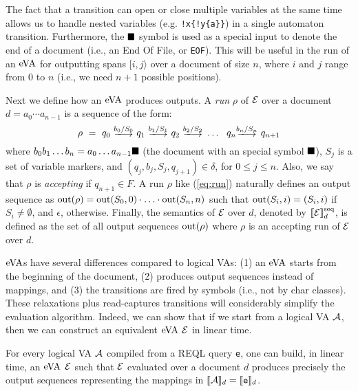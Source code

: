 The fact that a transition can open or close multiple variables at the same time
	allows us to handle nested variables (e.g. \texttt{!x\{!y\{a\}\}}) in a
	single automaton transition. Furthermore, the $\blacksquare$ symbol is used as a
	special input to denote the end of a document (i.e., an End Of File, or
	\texttt{EOF}). This will be useful in the run of an $\mathrm{eVA}$ for outputting
	spans $[i, j\rangle$ over a document of size $n$, where $i$ and $j$ range
	from $0$ to $n$ (i.e., we need $n+1$ possible positions).

Next we define how an $\mathrm{eVA}$ produces outputs. A \emph{run} $\rho$ of $\mathcal{E}$ over
a document $d = a_0 \cdots a_{n-1}$ is a sequence of the form:
\begin{equation}\label{eq:run}
	\rho \ = \ q_0 \ \longtrans{b_0 / S_0} \ q_1 \ \longtrans{b_1 / S_1} \ q_2 \ \longtrans{b_2 / S_2} \ \ldots \ \ q_{n} \longtrans{b_{n} / S_n} \ q_{n+1}
\end{equation}
where $b_0 b_1 \ldots b_n = a_0 \ldots a_{n-1} \blacksquare$ (the document with an
special symbol $\blacksquare$), $S_j$ is a set of variable markers, and
$(q_j,b_{j},S_{j}, q_{j+1}) \in \delta$, for $0\leq j\leq n$. Also, we say that
$\rho$ is \emph{accepting} if $q_{n+1} \in F$. A run $\rho$ like (\ref{eq:run})
naturally defines an output sequence as $\operatorname{out}(\rho) = \operatorname{out}(S_0, 0) \cdot
\ldots \cdot \operatorname{out}(S_n, n)$ such that $\operatorname{out}(S_i, i) = (S_i, i)$ if $S_i \neq
\emptyset$, and $\epsilon$, otherwise. Finally, the semantics of $\mathcal{E}$ over $d$,
denoted by $\llbracket\mathcal{E}\rrbracket^{\operatorname{seq}}_d$, is defined as the set of all output sequences
$\operatorname{out}(\rho)$ where $\rho$ is an accepting run of $\mathcal{E}$ over $d$.

$\mathrm{eVA}$s have several differences compared to logical VAs: (1) an $\mathrm{eVA}$ starts
from the beginning of the document, (2) produces output sequences instead of
mappings, and (3) the transitions are fired by symbols (i.e., not by char
classes). These relaxations plus read-captures transitions will considerably
simplify the evaluation algorithm.  Indeed, we can show that if we start from a
logical VA $\mathcal{A}$, then we can construct an equivalent $\mathrm{eVA}$ $\mathcal{E}$ in linear
time. %
\begin{proposition}\label{prop:eVAconstruction}
	For every logical VA $\mathcal{A}$ compiled from a REQL query \texttt{e}, one can
	build, in linear time, an $\mathrm{eVA}$ $\mathcal{E}$ such that $\mathcal{E}$ evaluated over a
	document $d$ produces precisely the output sequences representing the
	mappings in $\llbracket\mathcal{A}\rrbracket_d = \llbracket\texttt{e}\rrbracket_d$.
\end{proposition}

